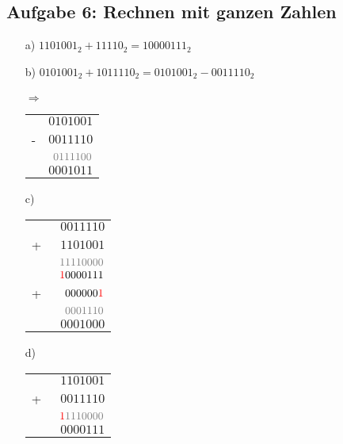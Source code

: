 \documentclass{article}
\begin{document}
    \subsection*{Aufgabe 6: Rechnen mit ganzen Zahlen}
    \begin{enumerate}
        \item[a)] $1101001_2 + 11110_2 = 10000111_2$
        \item[b)] $0101001_2 + 1011110_2 = 0101001_2 - 0011110_2$ \\\\
        $\Rightarrow$ 
        \begin{tabular}{cr}
             &$0101001$	\\
            -&$0011110$ \\
             &$\color{gray}0111100$ \\
             \hline
             &$0001011$
        \end{tabular}  
        \item[c)] \hfill \\
        \begin{tabular}{cr}
            &$\phantom{0}0011110$	\\
           +&$\phantom{0}1101001$	\\
            &$\color{gray}11110000$  \\
           \hline
            &$\textcolor{red}{1}0000111$ \\
           +&$\phantom{0}000000\textcolor{red}{1}$ \\
            &$\color{gray}\phantom{0}0001110$ \\
           \hline
            &$\phantom{0}0001000$
        \end{tabular}  
        \item[d)]  \hfill \\
        \begin{tabular}{cr}
            &$\phantom{0}1101001$	\\
           +&$\phantom{0}0011110$	\\
            &$\color{gray}\textcolor{red}{1}1110000$  \\
           \hline
            &$\phantom{0}0000111$
        \end{tabular}  
    \end{enumerate}
\end{document}
